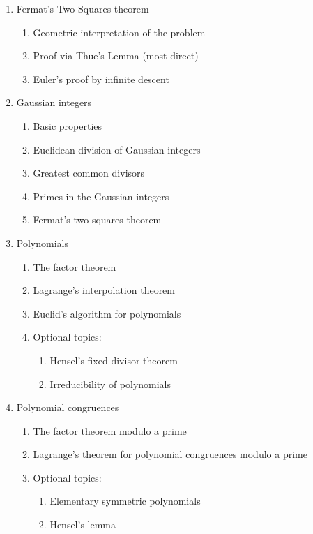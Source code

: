 \documentclass{article}
\begin{document}
\begin{enumerate}
\begin{enumerate}
  \item The quadratic character of $-1$.
  \end{enumerate}
\item Fermat's Two-Squares theorem
  \begin{enumerate}
  \item Geometric interpretation of the problem
  \item Proof via Thue's Lemma (most direct)
  \item Euler's proof by infinite descent
  \end{enumerate}
\item Gaussian integers
  \begin{enumerate}
  \item Basic properties
  \item Euclidean division of Gaussian integers
  \item Greatest common divisors
  \item Primes in the Gaussian integers
  \item Fermat's two-squares theorem
  \end{enumerate}
\item Polynomials
  \begin{enumerate}
  \item The factor theorem
  \item Lagrange's interpolation theorem
  \item Euclid's algorithm for polynomials
  \item Optional topics:
    \begin{enumerate}
    \item Hensel's fixed divisor theorem
    \item Irreducibility of polynomials
    \end{enumerate}
  \end{enumerate}
\item Polynomial congruences
  \begin{enumerate}
  \item The factor theorem modulo a prime
  \item Lagrange's theorem for polynomial congruences modulo a prime
  \item Optional topics:
    \begin{enumerate}
    \item Elementary symmetric polynomials
    \item Hensel's lemma
    \end{enumerate}
  \end{enumerate}

\end{enumerate}
\end{document}
